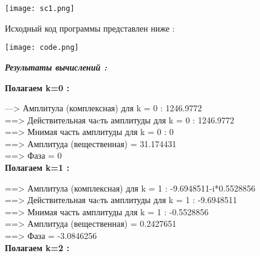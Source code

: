 \documentclass[a4paper,11pt]{article}
\begin{document}
		\newpage
		\begin{center}
			\texttt{[image: sc1.png]}
		\end{center}
		\begin{flushleft}
		\medskip
		\hangindent=1.5cm  \noindent
		Исходный код программы представлен ниже :
		\end{flushleft}	
		\begin{center}
			\texttt{[image: code.png]}			
		\end{center}
		\newpage
		\begin{flushleft}
		\textit{\textbf{Результаты вычислений :}}
		\\
		\medskip
		\hangindent=1.5cm  \noindent
		
\textbf{Полагаем k=0 :\\ }

 ---> Амплитула (комплексная) для k = 0 :  1246.9772\\ 
 ==> Действительная чаcть амплитуды  для k = 0 : 1246.9772\\ 
 ==> Мнимая часть амплитуды  для k = 0 : 0\\ 
 ==> Амплитуда (вещественная) = 31.174431\\ 
 ==> Фаза = 0\\ 
\textbf{Полагаем k=1 :\\} 

 ==> Амплитула (комплексная) для k = 1 : -9.6948511-i*0.5528856 \\ 
 ==> Действительная чаcть амплитуды  для k = 1 : -9.6948511\\ 
 ==> Мнимая часть амплитуды  для k = 1 : -0.5528856\\ 
 ==> Амплитуда (вещественная) = 0.2427651\\ 
 ==> Фаза = -3.0846256\\ 

\textbf{Полагаем k=2 :\\} 


\end{flushleft}
\end{document}
